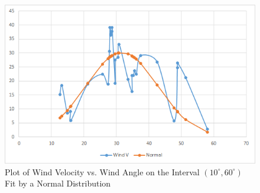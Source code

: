 \documentclass{journal}
\begin{document}
\begin{figure}[H]
  \centering
  \includegraphics[width=\textwidth]{alan-data-2.png}
  \caption{Plot of Wind Velocity vs. Wind Angle on the Interval $(10^{\circ}, 60^{\circ})$ Fit by a Normal Distribution}
\end{figure}
\end{document}
